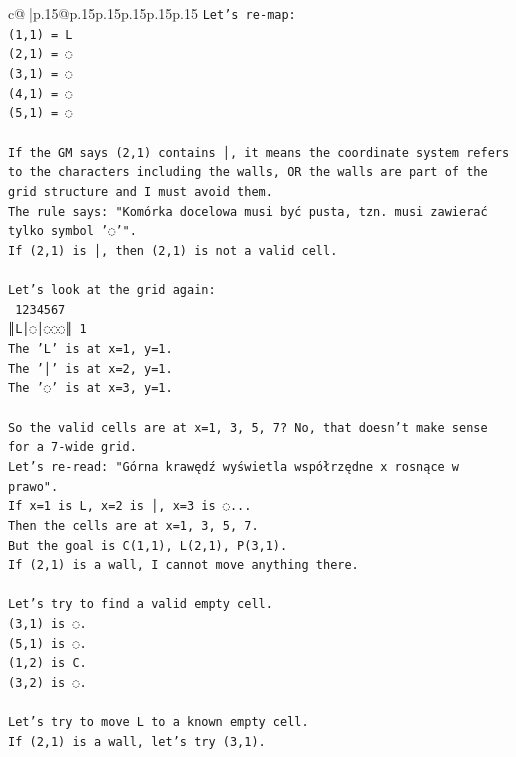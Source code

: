 \documentclass{article}
\begin{document}
{\begin{supertabular}{c@{$\;$}|p{.15\linewidth}@{}p{.15\linewidth}p{.15\linewidth}p{.15\linewidth}p{.15\linewidth}p{.15\linewidth}}
{{{\texttt{Let's re{-}map:} \\
\texttt{(1,1) = L} \\
\texttt{(2,1) = ◌} \\
\texttt{(3,1) = ◌} \\
\texttt{(4,1) = ◌} \\
\texttt{(5,1) = ◌} \\
\\ 
\texttt{If the GM says (2,1) contains │, it means the coordinate system refers to the characters including the walls, OR the walls are part of the grid structure and I must avoid them.} \\
\texttt{The rule says: "Komórka docelowa musi być pusta, tzn. musi zawierać tylko symbol '◌'".} \\
\texttt{If (2,1) is │, then (2,1) is not a valid cell.} \\
\\ 
\texttt{Let's look at the grid again:} \\
\texttt{ 1234567} \\
\texttt{║L│◌│◌◌◌║ 1} \\
\texttt{The 'L' is at x=1, y=1.} \\
\texttt{The '│' is at x=2, y=1.} \\
\texttt{The '◌' is at x=3, y=1.} \\
\\ 
\texttt{So the valid cells are at x=1, 3, 5, 7? No, that doesn't make sense for a 7{-}wide grid.} \\
\texttt{Let's re{-}read: "Górna krawędź wyświetla współrzędne x rosnące w prawo".} \\
\texttt{If x=1 is L, x=2 is │, x=3 is ◌...} \\
\texttt{Then the cells are at x=1, 3, 5, 7.} \\
\texttt{But the goal is C(1,1), L(2,1), P(3,1).} \\
\texttt{If (2,1) is a wall, I cannot move anything there.} \\
\\ 
\texttt{Let's try to find a valid empty cell.} \\
\texttt{(3,1) is ◌.} \\
\texttt{(5,1) is ◌.} \\
\texttt{(1,2) is C.} \\
\texttt{(3,2) is ◌.} \\
\\ 
\texttt{Let's try to move L to a known empty cell.} \\
\texttt{If (2,1) is a wall, let's try (3,1).} \\
}}}
\end{supertabular}}
\end{document}
